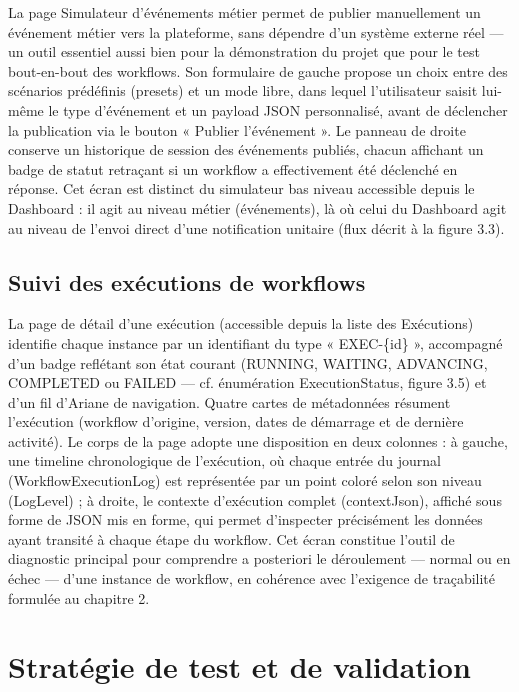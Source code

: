 \documentclass[12pt,a4paper]{report}
\begin{document}
La page Simulateur d'événements métier permet de publier manuellement un événement métier vers la plateforme, sans dépendre d'un système externe réel --- un outil essentiel aussi bien pour la démonstration du projet que pour le test bout-en-bout des workflows. Son formulaire de gauche propose un choix entre des scénarios prédéfinis (presets) et un mode libre, dans lequel l'utilisateur saisit lui-même le type d'événement et un payload JSON personnalisé, avant de déclencher la publication via le bouton « Publier l'événement ». Le panneau de droite conserve un historique de session des événements publiés, chacun affichant un badge de statut retraçant si un workflow a effectivement été déclenché en réponse. Cet écran est distinct du simulateur bas niveau accessible depuis le Dashboard : il agit au niveau métier (événements), là où celui du Dashboard agit au niveau de l'envoi direct d'une notification unitaire (flux décrit à la figure 3.3).

\subsection{Suivi des exécutions de workflows}

La page de détail d'une exécution (accessible depuis la liste des Exécutions) identifie chaque instance par un identifiant du type « EXEC-\{id\} », accompagné d'un badge reflétant son état courant (RUNNING, WAITING, ADVANCING, COMPLETED ou FAILED --- cf. énumération ExecutionStatus, figure 3.5) et d'un fil d'Ariane de navigation. Quatre cartes de métadonnées résument l'exécution (workflow d'origine, version, dates de démarrage et de dernière activité). Le corps de la page adopte une disposition en deux colonnes : à gauche, une timeline chronologique de l'exécution, où chaque entrée du journal (WorkflowExecutionLog) est représentée par un point coloré selon son niveau (LogLevel) ; à droite, le contexte d'exécution complet (contextJson), affiché sous forme de JSON mis en forme, qui permet d'inspecter précisément les données ayant transité à chaque étape du workflow. Cet écran constitue l'outil de diagnostic principal pour comprendre a posteriori le déroulement --- normal ou en échec --- d'une instance de workflow, en cohérence avec l'exigence de traçabilité formulée au chapitre 2.

\section{Stratégie de test et de validation}
\end{document}
